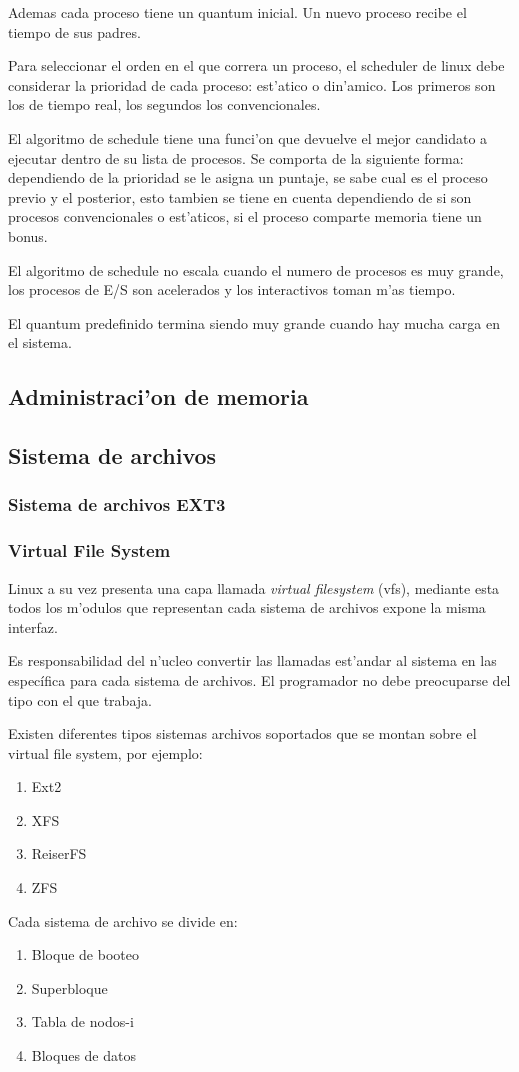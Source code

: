 Ademas cada proceso tiene un quantum inicial. Un nuevo proceso recibe el tiempo de sus padres.

Para seleccionar el orden en el que correra un proceso, el scheduler de linux debe considerar la prioridad de cada proceso: est'atico o din'amico. Los primeros son los de tiempo real, los segundos los convencionales.

El algoritmo de schedule tiene una funci'on que devuelve el mejor candidato a ejecutar dentro de su lista de procesos. Se comporta de la siguiente forma: dependiendo de la prioridad se le asigna un puntaje, se sabe cual es el proceso previo y el posterior, esto tambien se tiene en cuenta dependiendo de si son procesos convencionales o est'aticos, si el proceso comparte memoria tiene un bonus.

El algoritmo de schedule no escala cuando el numero de procesos es muy grande, los procesos de E/S son acelerados y los interactivos toman m'as tiempo.

El quantum predefinido termina siendo muy grande cuando hay mucha carga en el sistema.

\subsection{Administraci'on de memoria}

\subsection{Sistema de archivos}
\subsubsection{Sistema de archivos EXT3}

\subsubsection{Virtual File System}
Linux a su vez presenta una capa llamada \textit{virtual filesystem} (vfs), mediante esta todos los m'odulos que representan cada sistema de archivos expone la misma interfaz.

Es responsabilidad del n'ucleo convertir las llamadas est'andar al sistema en las específica para cada sistema de archivos. El programador no debe preocuparse del tipo con el que trabaja.

Existen diferentes tipos sistemas archivos soportados que se montan sobre el virtual file system, por ejemplo:
\begin{enumerate}
\item Ext2
\item XFS
\item ReiserFS
\item ZFS
\end{enumerate}
Cada sistema de archivo se divide en:
\begin{enumerate}
\item Bloque de booteo
\item Superbloque
\item Tabla de nodos-i
\item Bloques de datos
\end{enumerate}

